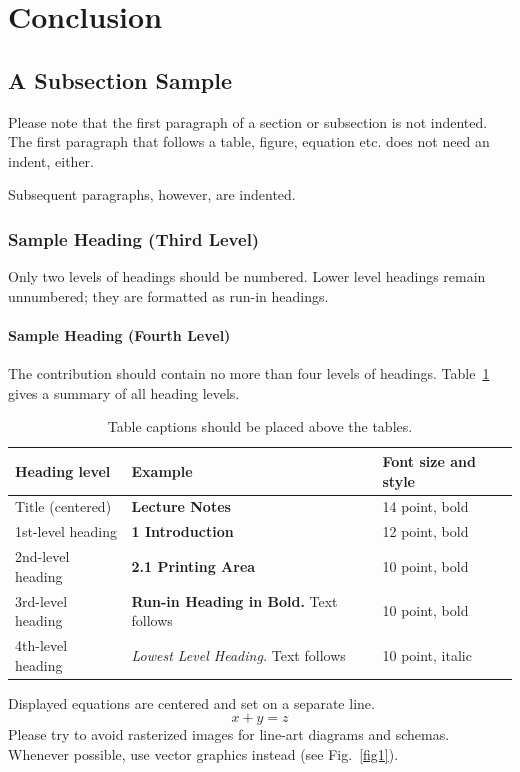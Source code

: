 \documentclass[runningheads]{llncs}
\begin{document}
\section{Conclusion} \label{sec:conclusion}

\newpage
\subsection{A Subsection Sample}
Please note that the first paragraph of a section or subsection is
not indented. The first paragraph that follows a table, figure,
equation etc. does not need an indent, either.

Subsequent paragraphs, however, are indented.

\subsubsection{Sample Heading (Third Level)} Only two levels of
headings should be numbered. Lower level headings remain unnumbered;
they are formatted as run-in headings.

\paragraph{Sample Heading (Fourth Level)}
The contribution should contain no more than four levels of
headings. Table~\ref{tab1} gives a summary of all heading levels.

\begin{table}
\caption{Table captions should be placed above the
tables.}\label{tab1}
\begin{tabular}{|l|l|l|}
\hline
Heading level &  Example & Font size and style\\
\hline
Title (centered) &  {\Large\bfseries Lecture Notes} & 14 point, bold\\
1st-level heading &  {\large\bfseries 1 Introduction} & 12 point, bold\\
2nd-level heading & {\bfseries 2.1 Printing Area} & 10 point, bold\\
3rd-level heading & {\bfseries Run-in Heading in Bold.} Text follows & 10 point, bold\\
4th-level heading & {\itshape Lowest Level Heading.} Text follows & 10 point, italic\\
\hline
\end{tabular}
\end{table}


\noindent Displayed equations are centered and set on a separate
line.
\begin{equation}
x + y = z
\end{equation}
Please try to avoid rasterized images for line-art diagrams and
schemas. Whenever possible, use vector graphics instead (see
Fig.~\ref{fig1}).
\end{document}
